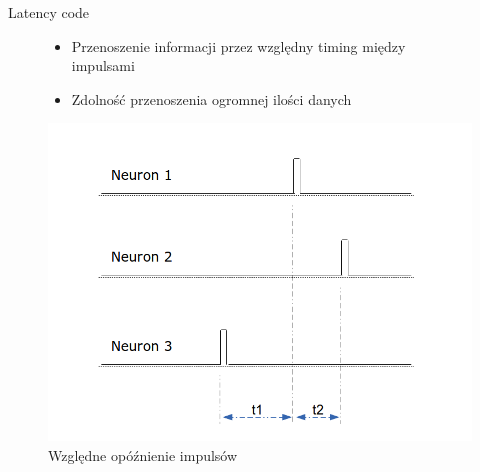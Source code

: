 \documentclass{beamer}
\begin{document}
\begin{frame}{Latency code}
	\begin{figure}[ht]
		\begin{minipage}{0.48\linewidth}
			\begin{itemize}
				\item Przenoszenie informacji przez względny timing między impulsami
				\item Zdolność przenoszenia ogromnej ilości danych
			\end{itemize}
		\end{minipage}
		\hfill
		\begin{minipage}{0.48\linewidth}
		\centering
		\includegraphics[width=\textwidth]{Latency.png}
		\caption{Względne opóźnienie impulsów}
		\end{minipage}
	\end{figure}
\end{frame}
\end{document}
